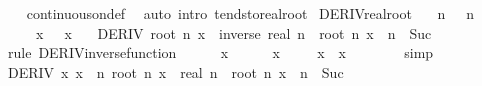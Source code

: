 \begin{isabellebody}
\ \ %
\endisadelimproof
%
\isatagproof
{}\isamarkupfalse%
\ continuous{\isacharunderscore}{\kern0pt}on{\isacharunderscore}{\kern0pt}def\ \isamarkupfalse%
\ {\isacharparenleft}{\kern0pt}auto\ intro{\isacharcolon}{\kern0pt}\ tendsto{\isacharunderscore}{\kern0pt}real{\isacharunderscore}{\kern0pt}root{\isacharparenright}{\kern0pt}%
\endisatagproof
{\isafoldproof}%
%
\isadelimproof
\isanewline
%
\endisadelimproof
\isanewline
{}\isamarkupfalse%
\ DERIV{\isacharunderscore}{\kern0pt}real{\isacharunderscore}{\kern0pt}root{\isacharcolon}{\kern0pt}\isanewline
\ \ \ n{\isacharcolon}{\kern0pt}\ {\isachardoublequoteopen}{}\ {\isacharless}{\kern0pt}\ n{\isachardoublequoteclose}\isanewline
\ \ \ \ \ x{\isacharcolon}{\kern0pt}\ {\isachardoublequoteopen}{}\ {\isacharless}{\kern0pt}\ x{\isachardoublequoteclose}\isanewline
\ \ \ {\isachardoublequoteopen}DERIV\ {\isacharparenleft}{\kern0pt}root\ n{\isacharparenright}{\kern0pt}\ x\ {\isacharcolon}{\kern0pt}{\isachargreater}{\kern0pt}\ inverse\ {\isacharparenleft}{\kern0pt}real\ n\ {\isacharasterisk}{\kern0pt}\ root\ n\ x\ {\isacharcircum}{\kern0pt}\ {\isacharparenleft}{\kern0pt}n\ {\isacharminus}{\kern0pt}\ Suc\ {}{\isacharparenright}{\kern0pt}{\isacharparenright}{\kern0pt}{\isachardoublequoteclose}\isanewline
%
\isadelimproof
%
\endisadelimproof
%
\isatagproof
{}\isamarkupfalse%
\ {\isacharparenleft}{\kern0pt}rule\ DERIV{\isacharunderscore}{\kern0pt}inverse{\isacharunderscore}{\kern0pt}function{\isacharparenright}{\kern0pt}\isanewline
\ \ \isamarkupfalse%
\ {\isachardoublequoteopen}{}\ {\isacharless}{\kern0pt}\ x{\isachardoublequoteclose}\isanewline
\ \ \ \ \isamarkupfalse%
\ x\ \isacommand{{\isachardot}{\kern0pt}}\isamarkupfalse%
\isanewline
\ \ \isamarkupfalse%
\ {\isachardoublequoteopen}x\ {\isacharless}{\kern0pt}\ x\ {\isacharplus}{\kern0pt}\ {}{\isachardoublequoteclose}\isanewline
\ \ \ \ \isamarkupfalse%
\ simp\isanewline
\ \ \isamarkupfalse%
\ {\isachardoublequoteopen}DERIV\ {\isacharparenleft}{\kern0pt}{\isasymlambda}x{\isachardot}{\kern0pt}\ x\ {\isacharcircum}{\kern0pt}\ n{\isacharparenright}{\kern0pt}\ {\isacharparenleft}{\kern0pt}root\ n\ x{\isacharparenright}{\kern0pt}\ {\isacharcolon}{\kern0pt}{\isachargreater}{\kern0pt}\ real\ n\ {\isacharasterisk}{\kern0pt}\ root\ n\ x\ {\isacharcircum}{\kern0pt}\ {\isacharparenleft}{\kern0pt}n\ {\isacharminus}{\kern0pt}\ Suc\ {}{\isacharparenright}{\kern0pt}{\isachardoublequoteclose}\isanewline

\end{isabellebody}
